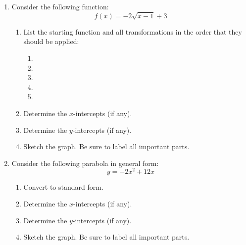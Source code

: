\documentclass[letterpaper,12pt,fleqn]{article}
\begin{document}
\begin{enumerate}
  \newpage

\item Consider the following function:
  \[f(x)=-2\sqrt{x-1}+3\]
  \begin{enumerate}
  \item List the starting function and all transformations in the order
    that they should be applied:
    \begin{enumerate}
    \item
    \item
    \item
    \item
    \item
    \end{enumerate}

  \item Determine the $x$-intercepts (if any).

    \vspace{1.5in}

  \item Determine the $y$-intercepts (if any).

    \vspace{1in}

  \item Sketch the graph. Be sure to label all important parts.
    
  \end{enumerate}

\item Consider the following parabola in general form:
  \[y=-2x^2+12x\]
  \begin{enumerate}
  \item Convert to standard form.

    \vspace{2in}

  \item Determine the $x$-intercepts (if any).

    \vspace{1.5in}

  \item Determine the $y$-intercepts (if any).

    \vspace{0.5in}

  \item Sketch the graph. Be sure to label all important parts.


\end{enumerate}
\end{enumerate}
\end{document}
